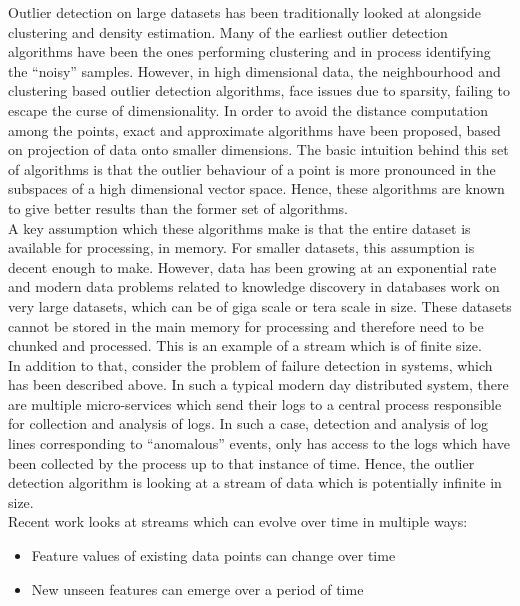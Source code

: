 \documentclass{article}
\begin{document}
    Outlier detection on large datasets has been traditionally looked at alongside clustering and density estimation. Many of the earliest outlier detection algorithms have been the ones performing clustering and in process identifying the ``noisy'' samples. However, in high dimensional data\cite{aggarwal2001outlier}, the neighbourhood and clustering based outlier detection algorithms, face issues due to sparsity, failing to escape the curse of dimensionality. In order to avoid the distance computation among the points, exact and approximate algorithms have been proposed, based on projection of data onto smaller dimensions. The basic intuition behind this set of algorithms is that the outlier behaviour of a point is more pronounced in the subspaces of a high dimensional vector space. Hence, these algorithms are known to give better results than the former set of algorithms. \\

    A key assumption which these algorithms make is that the entire dataset is available for processing, in memory. For smaller datasets, this assumption is decent enough to make. However, data has been growing at an exponential rate and modern data problems related to knowledge discovery in databases work on very large datasets, which can be of giga scale or tera scale in size. These datasets cannot be stored in the main memory for processing and therefore need to be chunked and processed. This is an example of a stream which is of finite size. \\

    In addition to that, consider the problem of failure detection in systems, which has been described above. In such a typical modern day distributed system, there are multiple micro-services which send their logs to a central process responsible for collection and analysis of logs. In such a case, detection and analysis of log lines corresponding to ``anomalous'' events, only has access to the logs which have been collected by the process up to that instance of time. Hence, the outlier detection algorithm is looking at a stream of data which is potentially infinite in size. \\

    Recent work\cite{Manzoor:2018:XOD:3219819.3220107} looks at streams which can evolve over time in multiple ways:
    
    \begin{itemize}
        \item Feature values of existing data points can change over time
        \item New unseen features can emerge over a period of time
    \end{itemize}
\end{document}
